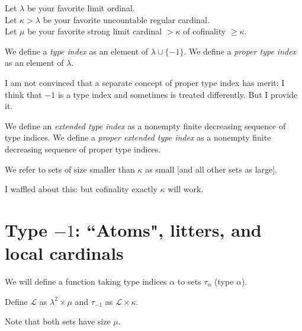 \begin{definition}
\label {def:params}
\leanok
{}
Let $\lambda$ be your favorite limit ordinal. \\
Let $\kappa>\lambda$ be your favorite uncountable regular cardinal. \\
Let $\mu$ be your favorite strong limit cardinal $>\kappa$ of cofinality $\geq \kappa$.
\end{definition}

\begin{definition}
\label {def:type-index}
We define a {\em type index} as an element of $\lambda \cup \{-1\}$.
We define a {\em proper type index} as an element of $\lambda$.
\end{definition}

I am not convinced that a separate concept of proper type index has merit:  I think that $-1$ is a type index and sometimes is treated differently.  But I provide it.

\begin{definition}
\label {def:extended-type-index}
\leanok
{}
We define an {\em extended type index} as a nonempty finite decreasing sequence of type indices.
We define a {\em proper extended type index} as a nonempty finite decreasing sequence of proper type indices.
\end{definition}

\begin{definition}
\label {def:small}
\leanok
{}
We refer to sets of size smaller than $\kappa$ as small [and all other sets as large].
\end{definition}

I waffled about this:  but cofinality exactly $\kappa$ will work.

\section{Type $-1$:  ``Atoms", litters, and local cardinals}

We will define a function taking type indices $\alpha$ to sets $\tau_\alpha$ (type $\alpha$).

\begin{definition}
\label {def:atom}
\leanok
{}
Define $\mathcal L$ as $ \lambda ^ 2 \times \mu$ and $\tau_{-1}$ as $\mathcal L \times \kappa$.

Note that both sets have size $\mu$.
\end{definition}

